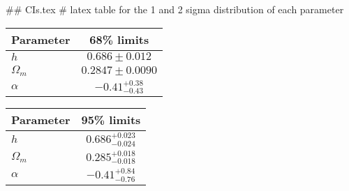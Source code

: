 ## CIs.tex
# latex table for the 1 and 2 sigma distribution of each parameter

\begin{tabular} { l  c}
 Parameter &  68\% limits\\
\hline
{\boldmath$h              $} & $0.686\pm 0.012            $\\
{\boldmath$\Omega_m       $} & $0.2847\pm 0.0090          $\\
{\boldmath$\alpha         $} & $-0.41^{+0.38}_{-0.43}     $\\
\hline
\end{tabular}

\begin{tabular} { l  c}
 Parameter &  95\% limits\\
\hline
{\boldmath$h              $} & $0.686^{+0.023}_{-0.024}   $\\
{\boldmath$\Omega_m       $} & $0.285^{+0.018}_{-0.018}   $\\
{\boldmath$\alpha         $} & $-0.41^{+0.84}_{-0.76}     $\\
\hline
\end{tabular}
